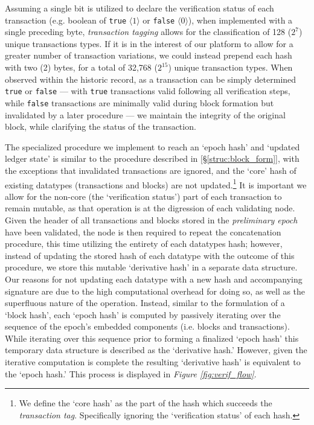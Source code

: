 Assuming a single bit is utilized to declare the verification status of each transaction (e.g. boolean of \texttt{true} \(\langle 1 \rangle\) or \texttt{false} \(\langle 0 \rangle\)), when implemented with a single preceding byte, \textit{transaction tagging} allows for the classification of 128 (\(2^7\)) unique transactions types. If it is in the interest of our platform to allow for a greater number of transaction variations, we could instead prepend each hash with two (2) bytes, for a total of 32,768 (\(2^15\)) unique transaction types. When observed within the historic record, as a transaction can be simply determined \texttt{true} or \texttt{false} — with \texttt{true} transactions valid following all verification steps, while \texttt{false} transactions are minimally valid during block formation but invalidated by a later procedure — we maintain the integrity of the original block, while clarifying the status of the transaction.

The specialized procedure we implement to reach an ‘epoch hash’ and ‘updated ledger state’ is similar to the procedure described in \textit{} [\S\ref{struc:block_form}], with the exceptions that invalidated transactions are ignored, and the ‘core’ hash of existing datatypes (transactions and blocks) are not updated.\footnote{We define the ‘core hash’ as the part of the hash which succeeds the \textit{transaction tag}. Specifically ignoring the ‘verification status’ of each hash.} It is important we allow for the non-core (the ‘verification status’) part of each transaction to remain mutable, as that operation is at the digression of each validating node. Given the header of all transactions and blocks stored in the \textit{preliminary epoch} have been validated, the node is then required to repeat the concatenation procedure, this time utilizing the entirety of each datatypes hash; however, instead of updating the stored hash of each datatype with the outcome of this procedure, we store this mutable ‘derivative hash’ in a separate data structure. Our reasons for not updating each datatype with a new hash and accompanying signature are due to the high computational overhead for doing so, as well as the superfluous nature of the operation. Instead, similar to the formulation of a ‘block hash', each ‘epoch hash’ is computed by passively iterating over the sequence of the epoch’s embedded components (i.e. blocks and transactions). While iterating over this sequence prior to forming a finalized ‘epoch hash’ this temporary data structure is described as the ‘derivative hash.’ However, given the iterative computation is complete the resulting ‘derivative hash’ is equivalent to the ‘epoch hash.’ This process is displayed in \textit{Figure \ref{fig:verif_flow}}.

